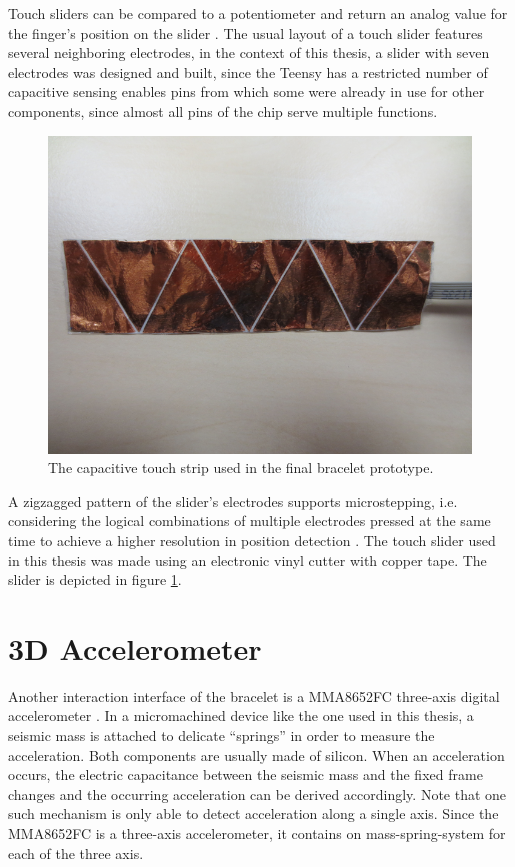Touch sliders can be compared to a potentiometer and return an analog value for the finger's position on the slider \cite{Camacho2010}. The usual layout of a touch slider features several neighboring electrodes, in the context of this thesis, a slider with seven electrodes was designed and built, since the Teensy has a restricted number of capacitive sensing enables pins from which some were already in use for other components, since almost all pins of the chip serve multiple functions.

\begin{figure}[bth]
	\begin{center}
	\includegraphics[width=.5\linewidth]{gfx/touchstrip.png}
	\end{center}
	\caption{The capacitive touch strip used in the final bracelet prototype.}\label{fig:touch}
\end{figure}

A zigzagged pattern of the slider's electrodes supports microstepping, i.e. considering the logical combinations of multiple electrodes pressed at the same time to achieve a higher resolution in position detection \cite{Camacho2010}. The touch slider used in this thesis was made using an electronic vinyl cutter with copper tape. The slider is depicted in figure \ref{fig:touch}.

\section{3D Accelerometer}
\label{sec:accel}
Another interaction interface of the bracelet is a MMA8652FC three-axis digital accelerometer \cite{datasheet:mma8652}. In a micromachined device like the one used in this thesis, a seismic mass is attached to delicate ``springs'' in order to measure the acceleration. Both components are usually made of silicon. When an acceleration occurs, the electric capacitance between the seismic mass and the fixed frame changes and the occurring acceleration can be derived accordingly. Note that one such mechanism is only able to detect acceleration along a single axis. Since the MMA8652FC is a three-axis accelerometer, it contains on mass-spring-system for each of the three axis.

